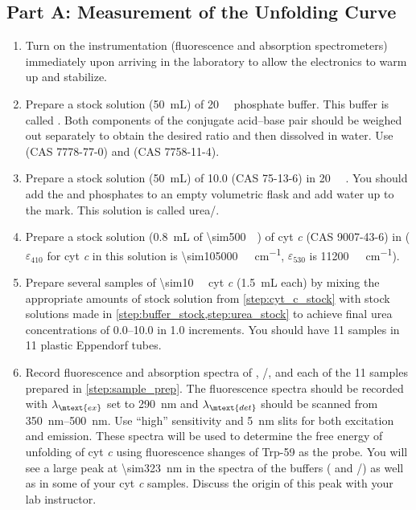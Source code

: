 \subsection{Part A: Measurement of the Unfolding Curve} %
\label{sub:part_a_measurement_of_the_unfolding_curve}

\begin{enumerate}
	\item Turn on the instrumentation (fluorescence and absorption spectrometers) immediately upon arriving in the laboratory to allow the electronics to warm up and stabilize. 
	\item Prepare a stock solution (\SI{50}{\mL}) of \SI{20}{\milli\Molar}  phosphate buffer. 
	This buffer is called . 
	Both components of the conjugate acid--base pair should be weighed out separately to obtain the desired ratio and then dissolved in water. 
	Use  (CAS 7778-77-0) and  (CAS 7758-11-4).
	\label{step:buffer_stock}
	\item Prepare a stock solution (\SI{50}{\mL}) of \SI{10.0}{\Molar}  (CAS 75-13-6) in \SI{20}{\milli\Molar} . 
	You should add the  and phosphates to an empty volumetric flask and add water up to the mark. 
	This solution is called urea/. 
	\label{step:urea_stock}
	\item Prepare a stock solution (\SI{0.8}{\mL} of \SI{\sim500}{\milli\Molar}) of cyt \emph{c} (CAS 9007-43-6) in  (\( \varepsilon_{410} \) for cyt \emph{c} in this solution is \SI{\sim105000}{\per\Molar\per\cm}, \( \varepsilon_{530} \) is \SI{11200}{\per\Molar\per\cm}).
	\label{step:cyt_c_stock}
	\item Prepare several samples of \SI{\sim10}{\micro\Molar} cyt \emph{c} (\SI{1.5}{\mL} each) by mixing the appropriate amounts of stock solution from \cref{step:cyt_c_stock} with stock solutions made in \cref{step:buffer_stock,step:urea_stock} to achieve final urea concentrations of \SIrange{0.0}{10.0}{\Molar} in \SI{1.0}{\Molar} increments. 
	You should have \num{11} samples in \num{11} plastic Eppendorf tubes.
	\label{step:sample_prep}
	\item Record fluorescence and absorption spectra of , /, and each of the \num{11} samples prepared in \cref{step:sample_prep}. 
	The fluorescence spectra should be recorded with \( \lambda_\mtext{ex} \) set to \SI{290}{\nm} and \( \lambda_\mtext{det} \) should be scanned from \SIrange{350}{500}{\nm}. 
	Use ``high'' sensitivity and \SI{5}{\nm} slits for both excitation and emission. 
	These spectra will be used to determine the free energy of unfolding of cyt \emph{c} using fluorescence shanges of Trp-59 as the probe. 
	You will see a large peak at \SI{\sim323}{\nm} in the spectra of the buffers ( and /) as well as in some of your cyt \emph{c} samples. 
	Discuss the origin of this peak with your lab instructor. 
	\label{step:fluor_spec}
\end{enumerate}

